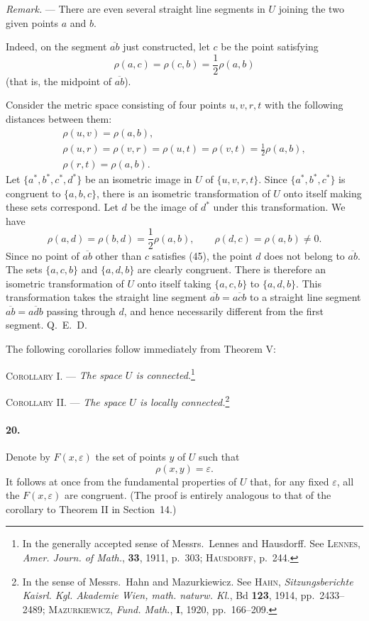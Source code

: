 \documentclass[a4paper,12pt]{amsart}
\newcommand{\srcpage}[1]{} %
\begin{document}
\textit{Remark.} --- There are even several straight line segments in $U$ joining the two given points $a$ and $b$.

\srcpage{82}
Indeed, on the segment $\overline{ab}$ just constructed, let $c$ be the point satisfying
\begin{equation}\rho(a,c)=\rho(c,b)=\frac12\rho(a,b)\tag{45}\end{equation}
(that is, the midpoint of $\overline{ab}$).

Consider the metric space consisting of four points $u,v,r,t$ with the following distances between them:
\[
\begin{gathered}
\rho(u,v)=\rho(a,b),\\
\rho(u,r)=\rho(v,r)=\rho(u,t)=\rho(v,t)=\frac12\rho(a,b),\\
\rho(r,t)=\rho(a,b).
\end{gathered}
\]
Let $\{a^*,b^*,c^*,d^*\}$ be an isometric image in $U$ of $\{u,v,r,t\}$. Since $\{a^*,b^*,c^*\}$ is congruent to $\{a,b,c\}$, there is an isometric transformation of $U$ onto itself making these sets correspond. Let $d$ be the image of $d^*$ under this transformation. We have
\[
\rho(a,d)=\rho(b,d)=\frac12\rho(a,b),\qquad \rho(d,c)=\rho(a,b)\ne0.
\]
Since no point of $\overline{ab}$ other than $c$ satisfies (45), the point $d$ does not belong to $\overline{ab}$. The sets $\{a,c,b\}$ and $\{a,d,b\}$ are clearly congruent. There is therefore an isometric transformation of $U$ onto itself taking $\{a,c,b\}$ to $\{a,d,b\}$. This transformation takes the straight line segment $\overline{ab}=\overline{acb}$ to a straight line segment $\overline{ab}=\overline{adb}$ passing through $d$, and hence necessarily different from the first segment. \hfill \mbox{Q. E. D.}

The following corollaries follow immediately from Theorem V:

\textsc{Corollary I.} --- \textit{The space $U$ is connected.}\footnote{In the generally accepted sense of Messrs.~Lennes and Hausdorff. See \textsc{Lennes}, \textit{Amer. Journ. of Math.}, \textbf{33}, 1911, p.~303; \textsc{Hausdorff}, p.~244.}

\textsc{Corollary II.} --- \textit{The space $U$ is locally connected.}\footnote{In the sense of Messrs.~Hahn and Mazurkiewicz. See \textsc{Hahn}, \textit{Sitzungsberichte Kaisrl. Kgl. Akademie Wien, math. naturw. Kl.}, Bd \textbf{123}, 1914, pp.~2433--2489; \textsc{Mazurkiewicz}, \textit{Fund. Math.}, \textbf{I}, 1920, pp.~166--209.}

\srcpage{83}
\paragraph{20.}
Denote by $F(x,\varepsilon)$ the set of points $y$ of $U$ such that
\[\rho(x,y)=\varepsilon.\]
It follows at once from the fundamental properties of $U$ that, for any fixed $\varepsilon$, all the $F(x,\varepsilon)$ are congruent. (The proof is entirely analogous to that of the corollary to Theorem II in Section~14.)
\end{document}
